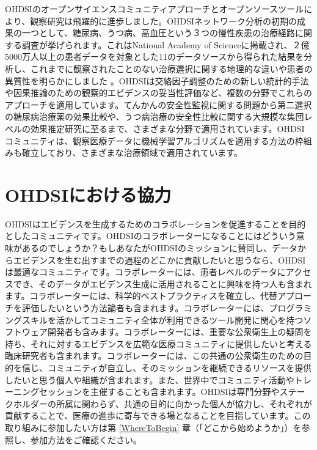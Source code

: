 \documentclass[
  11pt]{book}
\theoremstyle{definition}
\theoremstyle{definition}
\theoremstyle{definition}
\theoremstyle{definition}
\theoremstyle{remark}
\begin{document}
OHDSIのオープンサイエンスコミュニティアプローチとオープンソースツールにより、観察研究は飛躍的に進歩しました。OHDSIネットワーク分析の初期の成果の一つとして、糖尿病、うつ病、高血圧という３つの慢性疾患の治療経路に関する調査が挙げられます。これはNational Academy of Scienceに掲載され、２億5000万人以上の患者データを対象とした11のデータソースから得られた結果を分析し、これまでに観察されたことのない治療選択に関する地理的な違いや患者の異質性を明らかにしました \citep{Hripcsak7329} 。OHDSIは交絡因子調整のための新しい統計的手法\citep{tian_2018}や因果推論のための観察的エビデンスの妥当性評価\citep{schuemie_2018}など、複数の分野でこれらのアプローチを適用しています。てんかんの安全性監視に関する問題\citep{duke_2017}から第二選択の糖尿病治療薬の効果比較\citep{vashisht_2018}や、うつ病治療の安全性比較に関する大規模な集団レベルの効果推定研究\citep{schuemie_2018b}に至るまで、さまざまな分野で適用されています。OHDSIコミュニティは、観察医療データに機械学習アルゴリズムを適用する方法の枠組みも確立しており\citep{reps2018}、さまざまな治療領域で適用されています\citep{johnston_2019, cepeda_2018, reps_2019}。

\section{OHDSIにおける協力}\label{ohdsiux306bux304aux3051ux308bux5354ux529b}

OHDSIはエビデンスを生成するためのコラボレーションを促進することを目的としたコミュニティです。OHDSIのコラボレーターになることにはどういう意味があるのでしょうか？もしあなたがOHDSIのミッションに賛同し、データからエビデンスを生む出すまでの過程のどこかに貢献したいと思うなら、OHDSIは最適なコミュニティです。コラボレーターには、患者レベルのデータにアクセスでき、そのデータがエビデンス生成に活用されることに興味を持つ人も含まれます。コラボレーターには、科学的ベストプラクティスを確立し、代替アプローチを評価したいという方法論者も含まれます。コラボレーターには、プログラミングスキルを活かしてコミュニティ全体が利用できるツール開発に関心を持つソフトウェア開発者も含みます。コラボレーターには、重要な公衆衛生上の疑問を持ち、それに対するエビデンスを広範な医療コミュニティに提供したいと考える臨床研究者も含まれます。コラボレーターには、この共通の公衆衛生のための目的を信じ、コミュニティが自立し、そのミッションを継続できるリソースを提供したいと思う個人や組織が含まれます。また、世界中でコミュニティ活動やトレーニングセッションを主催することも含まれます。OHDSIは専門分野やステークホルダーの所属に関わらず、共通の目的に向かった個人が協力し、それぞれが貢献することで、医療の進歩に寄与できる場となることを目指しています。この取り組みに参加したい方は第 \ref{WhereToBegin} 章（「どこから始めようか」）を参照し、参加方法をご確認ください。
\end{document}
